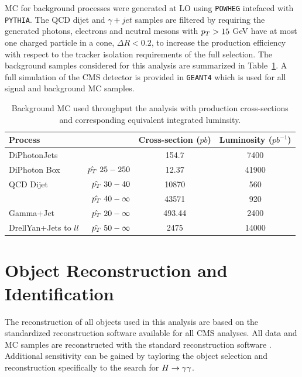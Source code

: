MC for background processes were generated at LO using \texttt{POWHEG} intefaced with \texttt{PYTHIA}.
The QCD dijet and $\gamma+jet$ samples are filtered by requiring the generated photons, electrons and neutral
mesons with $p_{T}>15$ GeV have at most one charged particle in a cone, $\Delta R<0.2$, to increase the 
production efficiency with respect to the tracker isolation requirements of the full selection.
The background samples considered for this analysis are summarized in Table~\ref{tab:backgroundmc}.
A full simulation of the CMS detector is provided in \texttt{GEANT4} which is used for all signal
and background MC samples.

\begin{table}
\begin{center}
\begin{tabular}{|l r|c|c|}
\hline
\textbf{Process}  & &  \textbf{Cross-section} ($pb$) & \textbf{Luminosity} ($pb^{-1}$)\\
\hline
\hline
DiPhotonJets & & 154.7 & 7400 \\
\hline
DiPhoton Box & $\hat{p_{T}}~25-250$ & 12.37 & 41900 \\
\hline 
QCD Dijet    & $\hat{p_{T}}~30-40$      & 10870 & 560 \\
	     & $\hat{p_{T}}~40-\infty$  & 43571 & 920 \\
\hline 
Gamma+Jet    & $\hat{p_{T}}~20-\infty$  & 493.44& 2400 \\
\hline 
DrellYan+Jets to $ll$  & $\hat{p_{T}}~50-\infty$  & 2475& 14000 \\
\hline
\end{tabular}
\caption{Background MC used throughput the analysis with production cross-sections and 
corresponding equivalent integrated luminsity.}
\label{tab:backgroundmc}
\end{center}
\end{table}


\section{Object Reconstruction and Identification}
\label{sec:objectrecoandid}

The reconstruction of all objects used in this analysis 
are based on the standardized reconstruction software available for all CMS analyses.
All data and MC samples are reconstructed with the standard reconstruction software \texttt{\cmssw}. 
Additional sensitivity can be gained by tayloring the object selection and reconstruction specifically
to the search for $H\rightarrow\gamma\gamma$. 



